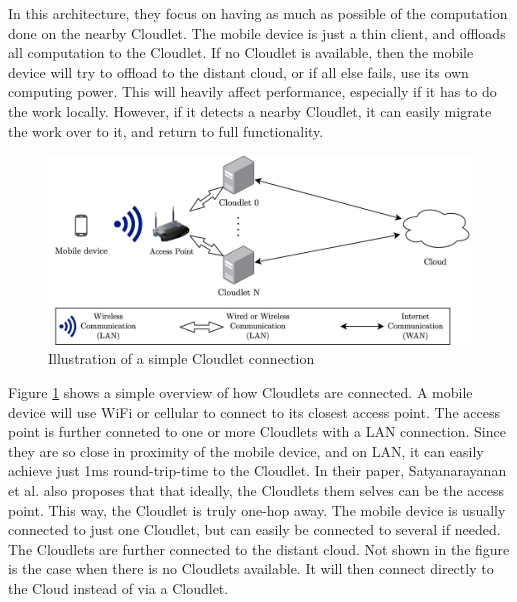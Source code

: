 In this architecture, they focus on having as much as possible of the computation done on the nearby Cloudlet. The mobile device is just a thin client, and offloads all computation to the Cloudlet. If no Cloudlet is available, then the mobile device will try to offload to the distant cloud, or if all else fails, use its own computing power. This will heavily affect performance, especially if it has to do the work locally. However, if it detects a nearby Cloudlet, it can easily migrate the work over to it, and return to full functionality.
 
\begin{figure}[t]
    \centering
    \includegraphics[scale=0.9]{chapters/4_architectures/figures/Cloudlet.png}
    \caption{Illustration of a simple Cloudlet connection}
    \label{fig:Cloudlet}
\end{figure}

Figure \ref{fig:Cloudlet} shows a simple overview of how Cloudlets are connected. A mobile device will use WiFi or cellular to connect to its closest access point. The access point is further conneted to one or more Cloudlets with a LAN connection. Since they are so close in proximity of the mobile device, and on LAN, it can easily achieve just 1ms round-trip-time to the Cloudlet. In their paper, Satyanarayanan et al.\cite{satyanarayanan_case_2009} also proposes that that ideally, the Cloudlets them selves can be the access point. This way, the Cloudlet is truly one-hop away. The mobile device is usually connected to just one Cloudlet, but can easily be connected to several if needed. The Cloudlets are further connected to the distant cloud. Not shown in the figure is the case when there is no Cloudlets available. It will then connect directly to the Cloud instead of via a Cloudlet. 


